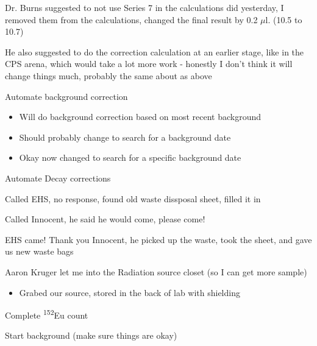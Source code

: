 \documentclass[idxtotoc,hyperref,openany,oneside]{labbook} %
\newcommand{\cmark}{\ding{51}}%
\newcommand{\done}{\rlap{$\square$}{\raisebox{2pt}{\large\hspace{1pt}\cmark}}%
  \hspace{-2.5pt}}
\newcommand{\tss}{\textsuperscript}
\begin{document}
\begin{todolist}
\item[\done]{Dr. Burns suggested to not use Series 7 in the calculations
  did yesterday, I removed them from the calculations, changed
  the final result by 0.2 $\mu$l. (10.5 to 10.7)}
\item{He also suggested to do the correction calculation at
  an earlier stage, like in the CPS arena, which would take a lot
  more work - honestly I don't think it will change things much,
  probably the same about as above}
\item[\done]{Automate background correction}
  \begin{itemize}
  \item{Will do background correction based on most recent background}
  \item{Should probably change to search for a background date}
  \item{Okay now changed to search for a specific background date}
  \end{itemize}
\item[\done]{Automate Decay corrections}
\end{todolist}


\begin{todolist}
\item[\done]{Called EHS, no response, found old waste dissposal sheet,
  filled it in}
\item[\done]{Called Innocent, he said he would come, please come!}
\item[\done]{EHS came! Thank you Innocent, he picked up the waste,
  took the sheet, and gave us new waste bags}
\end{todolist}


\begin{todolist}
\item[\done]{Aaron Kruger let me into the Radiation
  source closet (so I can get more sample)}
  \begin{itemize}
  \item{Grabed our source, stored in the back of lab with shielding}
  \end{itemize}
\item[\done]{Complete \tss{152}Eu count}
\item[\done]{Start background (make sure things are okay)}
\end{todolist}
\end{document}
